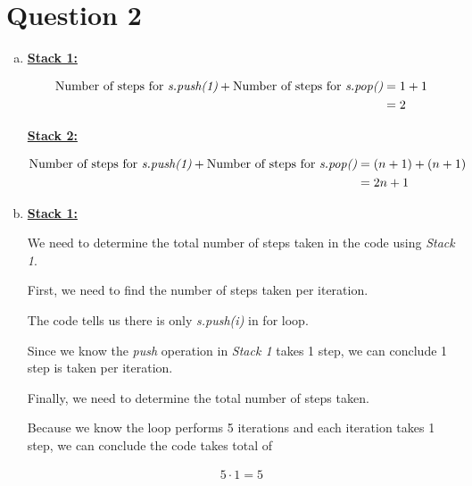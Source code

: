 \documentclass[12pt]{article}
\begin{document}
\section*{Question 2 }
\begin{enumerate}[a.]
    \item

    \underline{\textbf{Stack 1:}}

    \bigskip

    \begin{align*}
        \text{Number of steps for \textit{s.push(1)}} + \text{Number of steps for \textit{s.pop()}} &= 1 + 1\\
        &= 2
    \end{align*}

    \bigskip

    \underline{\textbf{Stack 2:}}

    \bigskip

    \begin{align*}
        \text{Number of steps for \textit{s.push(1)}} + \text{Number of steps for \textit{s.pop()}} &= (n+1) + (n+1)\\
        &= 2n + 1
    \end{align*}

    \item

    \underline{\textbf{Stack 1:}}

    \bigskip

    We need to determine the total number of steps taken in the code using \textit{Stack 1}.

    \bigskip

    First, we need to find the number of steps taken per iteration.

    \bigskip

    The code tells us there is only \textit{s.push(i)} in for loop.

    \bigskip

    Since we know the \textit{push} operation in \textit{Stack 1} takes 1 step,
    we can conclude 1 step is taken per iteration.

    \bigskip

    Finally, we need to determine the total number of steps taken.

    \bigskip

    Because we know the loop performs 5 iterations and each iteration takes 1 step,
    we can conclude the code takes total of

    \begin{align}
        5 \cdot 1 = 5
    \end{align}


\end{enumerate}
\end{document}
